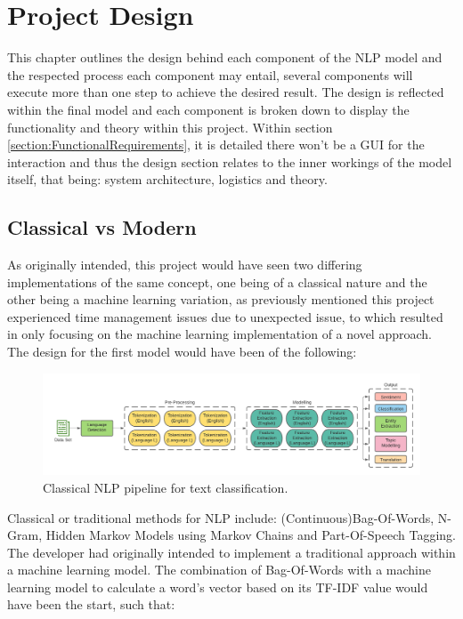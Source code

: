 \chapter{Project Design}

This chapter outlines the design behind each component of the NLP model and the respected process each component may entail, several components will execute more than one step to achieve the desired result. The design is reflected within the final model and each component is broken down to display the functionality and theory within this project. Within section \ref{section:FunctionalRequirements}, it is detailed there won’t be a GUI for the interaction and thus the design section relates to the inner workings of the model itself, that being: system architecture, logistics and theory.

\section{Classical vs Modern}

As originally intended, this project would have seen two differing implementations of the same concept, one being of a classical nature and the other being a machine learning variation, as previously mentioned this project experienced time management issues due to unexpected issue, to which resulted in only focusing on the machine learning implementation of a novel approach. The design for the first model would have been of the following:

\begin{figure}[H]
    \centering
    \includegraphics[width=\textwidth]{figures/chapter-5/ClassicalNLP.pdf}
    \caption[ClassicalNLP]{Classical NLP pipeline for text classification.
    \label{fig:ClassicalNLP}}
\end{figure}

Classical or traditional methods for NLP include: (Continuous)Bag-Of-Words, N-Gram, Hidden Markov Models using Markov Chains and Part-Of-Speech Tagging. The developer had originally intended to implement a traditional approach within a machine learning model. The combination of Bag-Of-Words with a machine learning model to calculate a word’s vector based on its TF-IDF value would have been the start, such that:

